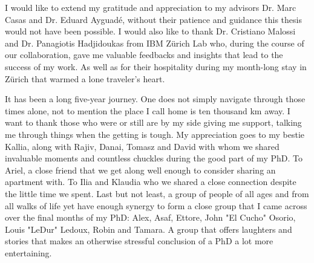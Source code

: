 
\begin{acknowledgements}
	I would like to extend my gratitude and appreciation to my advisors Dr. Marc
	Casas and Dr. Eduard Ayguad\'{e}, without their patience and guidance this
	thesis would not have been possible. I would also like to thank Dr.
	Cristiano Malossi and Dr. Panagiotis Hadjidoukas from IBM Z\"{u}rich Lab
	who, during the course of our collaboration, gave me valuable feedbacks and
	insights that lead to the success of my work. As well as for their
	hospitality during my month-long stay in Z\"{u}rich that warmed a lone
	traveler's heart.

	It has been a long five-year journey. One does not simply navigate through
	those times alone, not to mention the place I call home is ten thousand km
	away. I want to thank those who were or still are by my side giving me
	support, talking me through things when the getting is tough. My
	appreciation goes to my bestie Kallia, along with Rajiv, Danai, Tomasz and
	David with whom we shared invaluable moments and countless chuckles during
	the good part of my PhD. To Ariel, a close friend that we get along well enough
	to consider sharing an apartment with. To Ilia and Klaudia who we shared a close
	connection despite the little time we spent. Last but not least, a group of
	people of all ages and from all walks of life yet have enough synergy to
	form a close group that I came across over the final months of my PhD: Alex,
	Asaf, Ettore, John "El Cucho" Osorio, Louis "LeDur" Ledoux, Robin and
	Tamara. A group that offers laughters and stories that makes an otherwise
	stressful conclusion of a PhD a lot more entertaining.	

\end{acknowledgements}
